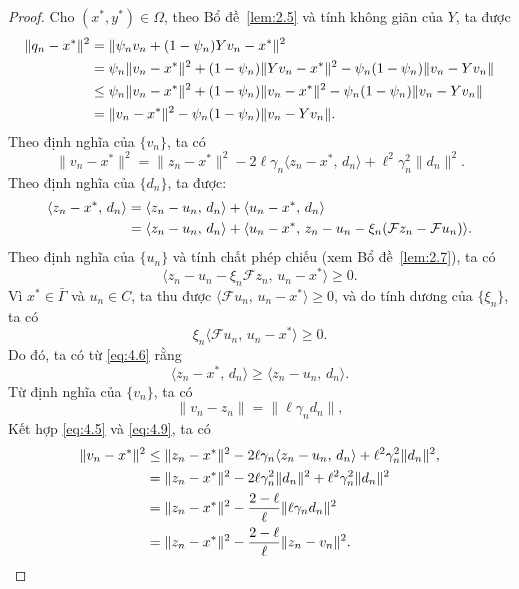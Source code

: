 \documentclass[11pt,a4paper]{article}
\theoremstyle{plain}
\theoremstyle{definition}
\theoremstyle{remark}
\numberwithin{equation}{section}
\newcommand{\Fc}{\mathcal{F}}
\newcommand{\inp}[2]{\langle #1,\,#2\rangle}
\newcommand{\nm}[1]{\lVert #1\rVert}
\newcommand{\Gam}{\bar{\Gamma}}
\begin{document}
\begin{proof}
Cho $(x^{*},y^{*})\in\Omega$, theo Bổ đề~\ref{lem:2.5} và tính không giãn của $Y$, ta được
\begin{align}
\nm{q_n-x^{*}}^2 &= \nm{\psi_n v_n+(1-\psi_n)Yv_n-x^{*}}^2\notag\\
&= \psi_n\nm{v_n-x^{*}}^2+(1-\psi_n)\nm{Yv_n-x^{*}}^2-\psi_n(1-\psi_n)\nm{v_n-Yv_n}\notag\\
&\le \psi_n\nm{v_n-x^{*}}^2+(1-\psi_n)\nm{v_n-x^{*}}^2-\psi_n(1-\psi_n)\nm{v_n-Yv_n}\notag\\
&= \nm{v_n-x^{*}}^2-\psi_n(1-\psi_n)\nm{v_n-Yv_n}. \label{eq:4.4}
\end{align}
Theo định nghĩa của $\{v_n\}$, ta có
\begin{equation}
\nm{v_n-x^{*}}^2=\nm{z_n-x^{*}}^2-2\ell\gamma_n\inp{z_n-x^{*}}{d_n}+\ell^2\gamma_n^2\nm{d_n}^2. \label{eq:4.5}
\end{equation}
Theo định nghĩa của $\{d_n\}$, ta được:
\begin{align}
\inp{z_n-x^{*}}{d_n} &= \inp{z_n-u_n}{d_n}+\inp{u_n-x^{*}}{d_n}\notag\\
&= \inp{z_n-u_n}{d_n}+\inp{u_n-x^{*}}{z_n-u_n-\xi_n(\Fc z_n-\Fc u_n)}. \label{eq:4.6}
\end{align}
Theo định nghĩa của $\{u_n\}$ và tính chất phép chiếu (xem Bổ đề~\ref{lem:2.7}), ta có
\begin{equation}
\inp{z_n-u_n-\xi_n\Fc z_n}{u_n-x^{*}}\ge 0. \label{eq:4.7}
\end{equation}
Vì $x^{*}\in\Gam$ và $u_n\in C$, ta thu được $\inp{\Fc u_n}{u_n-x^{*}}\ge 0$, và do tính dương của $\{\xi_n\}$, ta có
\begin{equation}
\xi_n\inp{\Fc u_n}{u_n-x^{*}}\ge 0. \label{eq:4.8}
\end{equation}
Do đó, ta có từ \eqref{eq:4.6} rằng
\begin{equation}
\inp{z_n-x^{*}}{d_n}\ge\inp{z_n-u_n}{d_n}. \label{eq:4.9}
\end{equation}
Từ định nghĩa của $\{v_n\}$, ta có
\[
\nm{v_n-z_n}=\nm{\ell\gamma_n d_n},
\]
Kết hợp \eqref{eq:4.5} và \eqref{eq:4.9}, ta có
\begin{align}
\nm{v_n-x^{*}}^2 &\le \nm{z_n-x^{*}}^2-2\ell\gamma_n\inp{z_n-u_n}{d_n}+\ell^2\gamma_n^2\nm{d_n}^2,\notag\\
&= \nm{z_n-x^{*}}^2-2\ell\gamma_n^2\nm{d_n}^2+\ell^2\gamma_n^2\nm{d_n}^2\notag\\
&= \nm{z_n-x^{*}}^2-\frac{2-\ell}{\ell}\nm{\ell\gamma_n d_n}^2\notag\\
&= \nm{z_n-x^{*}}^2-\frac{2-\ell}{\ell}\nm{z_n-v_n}^2. \label{eq:4.10}

\end{align}
\end{proof}
\end{document}
